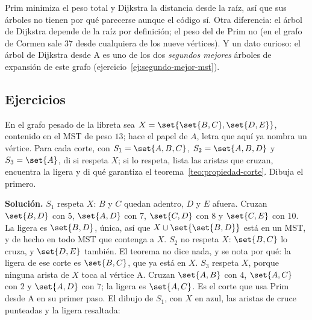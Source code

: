 \documentclass[11pt,letterpaper]{article}
\begin{document}
Prim minimiza el peso total y Dijkstra la distancia desde la raíz, así
que sus árboles no tienen por qué parecerse aunque el código sí. Otra
diferencia: el árbol de Dijkstra depende de la raíz por definición; el
peso del de Prim no (en el grafo de Cormen sale $37$ desde cualquiera
de los nueve vértices). Y un dato curioso: el árbol de Dijkstra desde A
es uno de los dos \emph{segundos mejores} árboles de expansión de este
grafo (ejercicio~\ref{ej:segundo-mejor-mst}).


\subsection*{Ejercicios}

\begin{ejercicio}
  \label{ej:corte-dibujado-mst}
  En el grafo pesado de la libreta sea
  $X = \set{\set{B, C}, \set{D, E}}$, contenido en el MST de peso
  $13$; hace el papel de $A$, letra que aquí ya nombra un vértice.
  Para cada corte, con $S_1 = \set{A, B, C}$, $S_2 = \set{A, B, D}$ y
  $S_3 = \set{A}$, di si respeta $X$; si lo respeta, lista las aristas
  que cruzan, encuentra la ligera y di qué garantiza el
  teorema~\ref{teo:propiedad-corte}. Dibuja el primero.
\end{ejercicio}

\textbf{Solución.} $S_1$ respeta $X$: $B$ y $C$ quedan adentro, $D$ y
$E$ afuera. Cruzan $\set{B, D}$ con $5$, $\set{A, D}$ con $7$,
$\set{C, D}$ con $8$ y $\set{C, E}$ con $10$. La ligera es
$\set{B, D}$, única, así que $X \cup \set{\set{B, D}}$ está en un MST,
y de hecho en todo MST que contenga a $X$. $S_2$ no respeta $X$:
$\set{B, C}$ lo cruza, y $\set{D, E}$ también. El teorema no dice
nada, y se nota por qué: la ligera de ese corte es $\set{B, C}$, que ya
está en $X$. $S_3$ respeta $X$, porque ninguna arista de $X$ toca al
vértice A. Cruzan $\set{A, B}$ con $4$, $\set{A, C}$ con $2$ y
$\set{A, D}$ con $7$; la ligera es $\set{A, C}$. Es el corte que usa
Prim desde A en su primer paso. El dibujo de $S_1$, con $X$ en azul,
las aristas de cruce punteadas y la ligera resaltada:
\begin{center}
\end{center}
\end{document}
